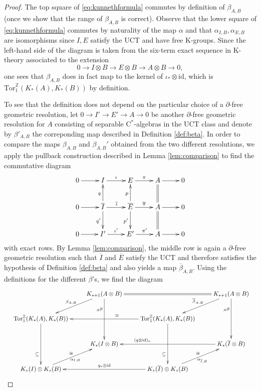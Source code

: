 \documentclass[a4paper,10pt]{amsart}
\newcommand{\cstar}{\ensuremath{\mathrm C^\ast}}
\numberwithin{equation}{section}
\numberwithin{theorem}{section}
\newcommand{\Z}{\mathbb{Z}}
\newcommand{\Tor}{\mathrm{Tor}_1^{\Z}}
\newcommand{\id}{\mathrm{id}}
\begin{document}
\begin{proof}
The top square of \eqref{eq:kunnethformula} commutes by definition of $\beta_{A,B}$ (once we show that the range of $\beta_{A,B}$ is correct).
Observe that the lower square of \eqref{eq:kunnethformula} commutes by naturality of the map $\alpha$ and that $\alpha_{I,B},\alpha_{E,B}$ are isomorphisms since $I,E$ satisfy the UCT and have free K-groups.
Since the left-hand side of the diagram is taken from the six-term exact sequence in K-theory associated to the extension $$
	0\to I\otimes B\to E\otimes B\to A\otimes B\to 0,
$$ 
one sees that $\beta_{A,B}$ does in fact map to the kernel of $\iota_*\otimes\id$, which is $\Tor(K_*(A),K_*(B))$ by definition.

To see that the definition does not depend on the particular choice of a $\partial$-free geometric resolution, let $0\to I'\to E'\to A\to 0$ be another $\partial$-free geometric resolution for $A$ consisting of separable $\cstar$-algebras in the UCT class and denote by $\beta'_{A,B}$ the correponding map described in Definition \ref{def:beta}.
In order to compare the maps $\beta_{A,B}$ and $\beta_{A,B}'$ obtained from the two different resolutions, we apply the pullback construction described in Lemma \ref{lem:comparison} to find the commutative diagram
\[
	\xymatrix{
		0\ar[r]&I\ar[r]^-\iota &E\ar[r]^-\pi&A\ar[r] &0 \\
			0 \ar[r] & \overline I  \ar[u]^q \ar[d]_{q'} \ar[r]^{\overline \iota} & \overline E \ar[u]^p \ar[d]_{p'} \ar[r]^{\overline \pi} & A \ar[r]  \ar@{=}[u] \ar@{=}[d] & 0  \\
			0\ar[r]&I'\ar[r]^-{\iota'} &E'\ar[r]^-{\pi'}&A\ar[r]&0
	}
\]
with exact rows. By Lemma \ref{lem:comparison}, the middle row is again a $\partial$-free geometric resolution such that $\overline I$ and $\overline E$ satisfy the UCT and  therefore satisfies the hypothesis of Definition \ref{def:beta} and also yields a map $\overline{\beta}_{A,B}$. Using the definitions for the different $\beta$'s, we find the diagram 
\[
\resizebox{\textwidth}{!}{
	\xymatrix{
		& K_{*+1}(A\otimes B) \ar@{=}[rr] \ar[dl]_-{\beta_{A,B}} \ar[dd]_(.3){{}_A \partial} && K_{*+1}(A\otimes B) \ar[dl]_-{\overline{\beta}_{A,B}} \ar[dd]_(.3){{}_A \partial}\\
		\Tor(K_*(A),K_*(B)) \ar[dd]_(.7)\subseteq && \ar[ll]_(.4)\cong \Tor(K_*(A),K_*(B)) \ar[dd]_(.7)\subseteq\\
		& K_*(I \otimes B) && K_*(\overline I \otimes B) \ar[ll]_(.7){(q \otimes \id)_*} \\
		K_*(I) \otimes K_*(B)  \ar[ur]^\cong_{\alpha_{I,B}} && K_*(\overline I) \otimes K_*(B) \ar[ll]_{q_* \otimes \id} \ar[ur]^\cong_{\alpha_{\overline I, B}}
}}\]
\end{proof}
\end{document}
